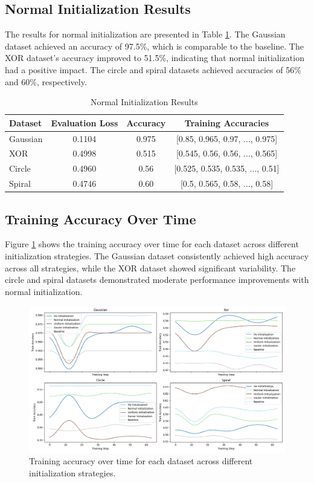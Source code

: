 \documentclass{article} %
\begin{document}
\subsection{Normal Initialization Results}
The results for normal initialization are presented in Table \ref{tab:normal_results}. The Gaussian dataset achieved an accuracy of 97.5\%, which is comparable to the baseline. The XOR dataset's accuracy improved to 51.5\%, indicating that normal initialization had a positive impact. The circle and spiral datasets achieved accuracies of 56\% and 60\%, respectively.

\begin{table}[h]
    \centering
    \caption{Normal Initialization Results}
    \label{tab:normal_results}
    \begin{tabular}{lccc}
        \toprule
        Dataset & Evaluation Loss & Accuracy & Training Accuracies \\
        \midrule
        Gaussian & 0.1104 & 0.975 & [0.85, 0.965, 0.97, ..., 0.975] \\
        XOR & 0.4998 & 0.515 & [0.545, 0.56, 0.56, ..., 0.565] \\
        Circle & 0.4960 & 0.56 & [0.525, 0.535, 0.535, ..., 0.51] \\
        Spiral & 0.4746 & 0.60 & [0.5, 0.565, 0.58, ..., 0.58] \\
        \bottomrule
    \end{tabular}
\end{table}

\subsection{Training Accuracy Over Time}
Figure \ref{fig:train_acc} shows the training accuracy over time for each dataset across different initialization strategies. The Gaussian dataset consistently achieved high accuracy across all strategies, while the XOR dataset showed significant variability. The circle and spiral datasets demonstrated moderate performance improvements with normal initialization.

\begin{figure}[h]
    \centering
    \includegraphics[width=\textwidth]{train_acc.png}
    \caption{Training accuracy over time for each dataset across different initialization strategies.}
    \label{fig:train_acc}
\end{figure}
\end{document}
